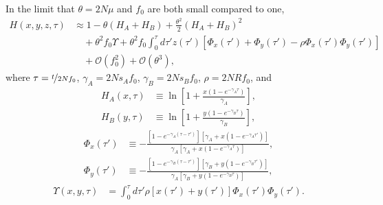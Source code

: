 \documentclass[11pt]{article}
\begin{document}
In the limit that $\theta = 2N\mu$ and $f_0$ are both small compared to one, 
\begin{align}\label{eq:h_expansion}
    H(x, y, z, \tau) &\approx 1 -\theta (H_A + H_B)
    + \frac{\theta^2}{2}\left(H_A + H_B\right)^2 \\\nonumber
    &\quad + \theta^2f_0\Upsilon + \theta^2f_0\int_0^{\tau}d \tau' z(\tau') \left[\Phi_x(\tau')+\Phi_y(\tau')-\rho\Phi_x(\tau')\Phi_y(\tau')\right] \\\nonumber
    &\quad + \mathcal{O}(f_0^2) +\mathcal{O}(\theta^3),
\end{align}
where $\tau = \nicefrac{t}{2Nf_0}$, $\gamma_A = 2Ns_Af_0$, $\gamma_B = 2Ns_Bf_0$, $\rho = 2NRf_0$, and 
\begin{subequations}\begin{align}
    H_A(x, \tau) &\equiv \ln \left[1 + \frac{x(1-e^{-\gamma_A\tau})}{\gamma_A}\right], \\
    H_B(y, \tau) &\equiv \ln \left[1 + \frac{y(1-e^{-\gamma_B\tau})}{\gamma_B}\right],
\end{align}\end{subequations}
\begin{subequations}\begin{align}
    \Phi_x(\tau') &\equiv -\frac{[ 1-e^{-\gamma_A (\tau-\tau')} ][\gamma_A+x(1-e^{-\gamma_A \tau'})]}{\gamma_A \left[ \gamma_A+x(1-e^{-\gamma_A \tau}) \right]}, \\
    \Phi_y(\tau') &\equiv -\frac{[1-e^{-\gamma_B (\tau-\tau')}][\gamma_B+y(1-e^{-\gamma_B \tau'})]}{\gamma_A \left[ \gamma_B+y(1-e^{-\gamma_B \tau}) \right]},
\end{align}\end{subequations}
\begin{align}
    \Upsilon(x, y, \tau) &= \int_0^{\tau} d\tau' \rho \left[x(\tau') + y(\tau')\right]\Phi_x(\tau')\Phi_y(\tau').
\end{align}
\end{document}
